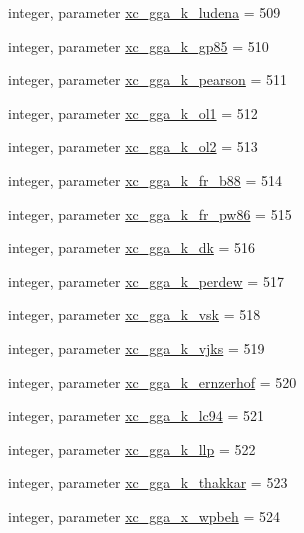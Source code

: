 \begin{DoxyCompactItemize}
integer, parameter \hyperlink{classlibxc__funcs__m_a6475c093454c530ad518fa7e3a510a62}{xc\-\_\-gga\-\_\-k\-\_\-ludena} = 509
\item 
integer, parameter \hyperlink{classlibxc__funcs__m_a77de61311b5ac4df12321dd99af129cd}{xc\-\_\-gga\-\_\-k\-\_\-gp85} = 510
\item 
integer, parameter \hyperlink{classlibxc__funcs__m_a94d94678ce6e81922ea114df3ef172b6}{xc\-\_\-gga\-\_\-k\-\_\-pearson} = 511
\item 
integer, parameter \hyperlink{classlibxc__funcs__m_ab247fe1f01d85242ef5d736e1eac910f}{xc\-\_\-gga\-\_\-k\-\_\-ol1} = 512
\item 
integer, parameter \hyperlink{classlibxc__funcs__m_a665be38eab97cb94427b1067b053be43}{xc\-\_\-gga\-\_\-k\-\_\-ol2} = 513
\item 
integer, parameter \hyperlink{classlibxc__funcs__m_a65556ad1369c3ba7f362aaa342c4b0b5}{xc\-\_\-gga\-\_\-k\-\_\-fr\-\_\-b88} = 514
\item 
integer, parameter \hyperlink{classlibxc__funcs__m_a512d0cc3d8821ba0800cc2b98c371bd9}{xc\-\_\-gga\-\_\-k\-\_\-fr\-\_\-pw86} = 515
\item 
integer, parameter \hyperlink{classlibxc__funcs__m_a36eb3be135160cf0bfc1d3de2bced88c}{xc\-\_\-gga\-\_\-k\-\_\-dk} = 516
\item 
integer, parameter \hyperlink{classlibxc__funcs__m_ae2575d7cb984fc2fde91e76e83de9f16}{xc\-\_\-gga\-\_\-k\-\_\-perdew} = 517
\item 
integer, parameter \hyperlink{classlibxc__funcs__m_a7469e3c9c8c4701e816ef1ef8c1f0fd1}{xc\-\_\-gga\-\_\-k\-\_\-vsk} = 518
\item 
integer, parameter \hyperlink{classlibxc__funcs__m_a9f32ed4c3dc3a375b7306b6b288aa72a}{xc\-\_\-gga\-\_\-k\-\_\-vjks} = 519
\item 
integer, parameter \hyperlink{classlibxc__funcs__m_aa3eec69214fa28babffd3b5d385b8cf8}{xc\-\_\-gga\-\_\-k\-\_\-ernzerhof} = 520
\item 
integer, parameter \hyperlink{classlibxc__funcs__m_a0233a354833ae87833c208be6d08eb96}{xc\-\_\-gga\-\_\-k\-\_\-lc94} = 521
\item 
integer, parameter \hyperlink{classlibxc__funcs__m_a7b54da171f444896b071154d5cf43543}{xc\-\_\-gga\-\_\-k\-\_\-llp} = 522
\item 
integer, parameter \hyperlink{classlibxc__funcs__m_a475accdc50e4e42b2a8718d63bc464df}{xc\-\_\-gga\-\_\-k\-\_\-thakkar} = 523
\item 
integer, parameter \hyperlink{classlibxc__funcs__m_a948291ae88518657e047bd6fb784306e}{xc\-\_\-gga\-\_\-x\-\_\-wpbeh} = 524

\end{DoxyCompactItemize}
